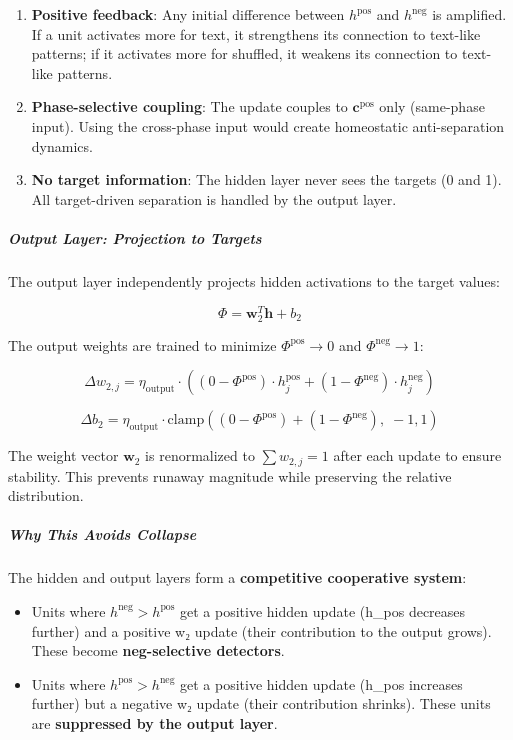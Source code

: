 \documentclass[
  11pt,
  a4paper,
]{article}
\providecommand{\tightlist}{%
  \setlength{\itemsep}{0pt}\setlength{\parskip}{0pt}}
\begin{document}
\begin{enumerate}
\def\labelenumi{\arabic{enumi}.}
\tightlist
\item
  \textbf{Positive feedback}: Any initial difference between
  \(h^{\text{pos}}\) and \(h^{\text{neg}}\) is amplified. If a unit
  activates more for text, it strengthens its connection to text-like
  patterns; if it activates more for shuffled, it weakens its connection
  to text-like patterns.
\item
  \textbf{Phase-selective coupling}: The update couples to
  \(\mathbf{c}^{\text{pos}}\) only (same-phase input). Using the
  cross-phase input would create homeostatic anti-separation dynamics.
\item
  \textbf{No target information}: The hidden layer never sees the
  targets (0 and 1). All target-driven separation is handled by the
  output layer.
\end{enumerate}

\subparagraph{Output Layer: Projection to
Targets}\label{output-layer-projection-to-targets}

The output layer independently projects hidden activations to the target
values:

\[
\Phi = \mathbf{w}_2^T \mathbf{h} + b_2
\]

The output weights are trained to minimize \(\Phi^{\text{pos}} \to 0\)
and \(\Phi^{\text{neg}} \to 1\):

\[
\Delta w_{2,j} = \eta_{\text{output}} \cdot \left( (0 - \Phi^{\text{pos}}) \cdot h_j^{\text{pos}} + (1 - \Phi^{\text{neg}}) \cdot h_j^{\text{neg}} \right)
\]

\[
\Delta b_2 = \eta_{\text{output}} \cdot \text{clamp}\left( (0 - \Phi^{\text{pos}}) + (1 - \Phi^{\text{neg}}),\; -1, 1 \right)
\]

The weight vector \(\mathbf{w}_2\) is renormalized to
\(\sum w_{2,j} = 1\) after each update to ensure stability. This
prevents runaway magnitude while preserving the relative distribution.

\subparagraph{Why This Avoids Collapse}\label{why-this-avoids-collapse}

The hidden and output layers form a \textbf{competitive cooperative
system}:

\begin{itemize}
\tightlist
\item
  Units where \(h^{\text{neg}} > h^{\text{pos}}\) get a positive hidden
  update (h\_pos decreases further) and a positive w₂ update (their
  contribution to the output grows). These become \textbf{neg-selective
  detectors}.
\item
  Units where \(h^{\text{pos}} > h^{\text{neg}}\) get a positive hidden
  update (h\_pos increases further) but a negative w₂ update (their
  contribution shrinks). These units are \textbf{suppressed by the
  output layer}.
\end{itemize}
\end{document}
